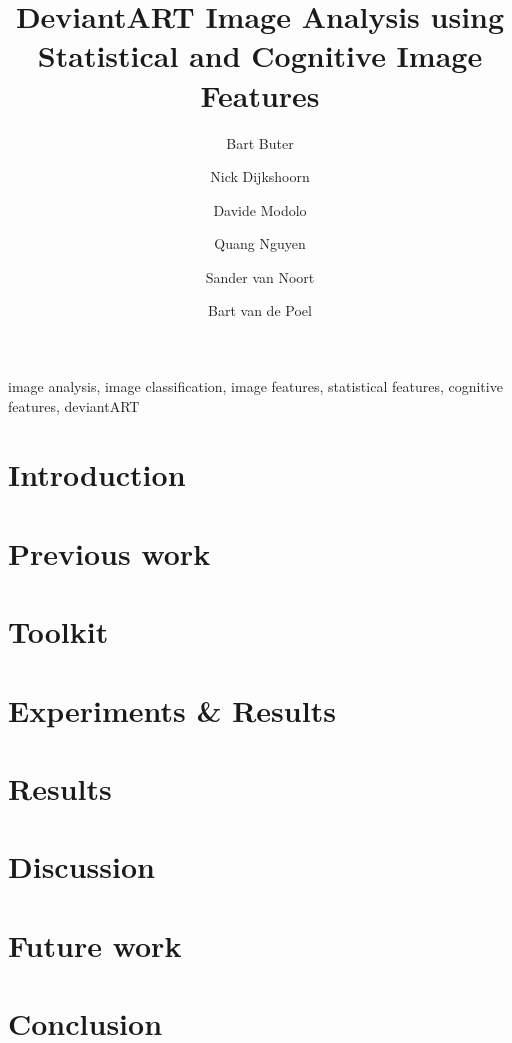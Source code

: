 \documentclass[%
        final,
        notitlepage,
        narroweqnarray,
        inline,
        ]{ieee}
\begin{document}
\title[DeviantART Image Analysis]{%
       DeviantART Image Analysis using Statistical and Cognitive Image Features}
\author{Bart Buter  \and Nick Dijkshoorn \and Davide Modolo  \and Quang Nguyen \and Sander van Noort \and Bart van de Poel}

\maketitle


\begin{abstract}

\end{abstract}


\begin{keywords}
image analysis, image classification, image features, statistical features, cognitive features, deviantART
\end{keywords}


\section{Introduction}



\section{Previous work}



\section{Toolkit}



\section{Experiments \& Results}



\section{Results}



\section{Discussion}


\section{Future work}


\section{Conclusion}


\nocite{*}


\end{document}
